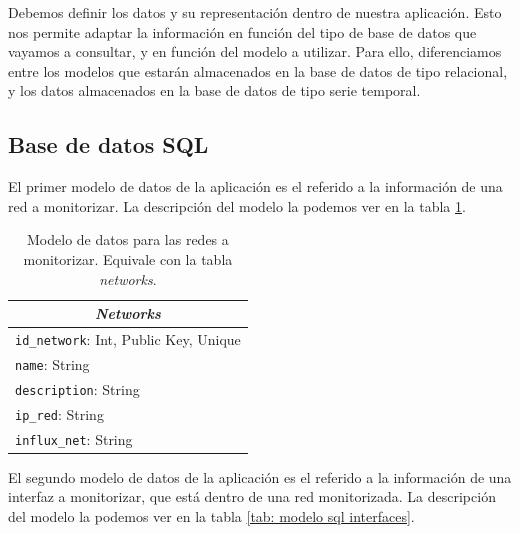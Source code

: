\documentclass[a4paper, oneside, 12pt]{book}
\begin{document}
	\noindent Debemos definir los datos y su representación dentro de nuestra aplicación. Esto nos permite adaptar la información en función del tipo de base de datos que vayamos a consultar, y en función del modelo a utilizar. Para ello, diferenciamos entre los modelos que estarán almacenados en la base de datos de tipo relacional, y los datos almacenados en la base de datos de tipo serie temporal.
	
	\subsection{Base de datos SQL}
	
	\noindent El primer modelo de datos de la aplicación es el referido a la información de una red a monitorizar. La descripción del modelo la podemos ver en la tabla \ref{tab: modelo sql networks}.
	
	
	\begin{table}[h!]
		\centering
		\begin{tabular}{|l|}
			\hline
			\multicolumn{1}{|c|}{\textit{\textbf{Networks}}} \\ \hline
			\texttt{id\_network}: Int, Public Key, Unique                 \\ \hline
			\texttt{name}: String                                     \\ \hline
			\texttt{description}: String                              \\ \hline
			\texttt{ip\_red}: String                                  \\ \hline
			\texttt{influx\_net}: String                              \\ \hline
		\end{tabular}
		\caption{Modelo de datos para las redes a monitorizar. Equivale con la tabla \textit{networks}.}
		\label{tab: modelo sql networks}
	\end{table}
	
	\vspace{12px}
	
	\noindent El segundo modelo de datos de la aplicación es el referido a la información de una interfaz a monitorizar, que está dentro de una red monitorizada. La descripción del modelo la podemos ver en la tabla \ref{tab: modelo sql interfaces}.
	
\end{document}
